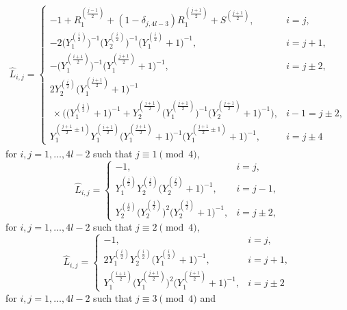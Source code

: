 \documentclass[pdftex]{sigma}
\numberwithin{equation}{section}
\begin{document}
	\begin{gather*}\hat{L}_{i,j}=\begin{cases}
		-1+R_1^{(\frac{j-1}{2})}+(1-\delta_{j,4l-3})R_1^{(\frac{j+1}{2})}+S^{(\frac{j+1}{2})},&i=j,\\
		-2\bigl(Y_1^{(\frac{i}{2})}\bigr)^{-1}\bigl(Y_2^{(\frac{i}{2})}\bigr)^{-1}\bigl(Y_1^{(\frac{i}{2})}+1\bigr)^{-1},&i=j+1,\\
		-\bigl(Y_1^{(\frac{i+1}{2})}\bigr)^{-1}\bigl(Y_1^{(\frac{j+1}{2})}+1\bigr)^{-1},&i=j\pm2,\\
2Y_2^{(\frac{i}{2})}\bigl(Y_1^{(\frac{j+1}{2})}+1\bigr)^{-1} \\
\ \times \bigl(\bigl(Y_1^{(\frac{i}{2})}+1\bigr)^{-1}+Y_2^{(\frac{j+1}{2})}\bigl(Y_1^{(\frac{j+1}{2})}\bigr)^{-1}\bigl(Y_2^{(\frac{j+1}{2})}+1\bigr)^{-1}\bigr),&i-1=j\pm2,\\
		Y_1^{(\frac{j+1}{2}\pm1)}Y_1^{(\frac{i+1}{2})}\bigl(Y_1^{(\frac{j+1}{2})}+1\bigr)^{-1}\bigl(Y_1^{(\frac{j+1}{2}\pm1)}+1\bigr)^{-1},& i=j\pm4
	\end{cases}\end{gather*}
for $i,j=1,\dots,4l-2$ such that $j\equiv1\pmod{4}$,
	\[\hat{L}_{i,j}=\begin{cases}
		-1,& i=j,\\
		Y_1^{(\frac{j}{2})}Y_2^{(\frac{j}{2})}\bigl(Y_2^{(\frac{j}{2})}+1\bigr)^{-1},& i=j-1,\\
		Y_2^{(\frac{i}{2})}\bigl(Y_2^{(\frac{j}{2})}\bigr)^2\bigl(Y_2^{(\frac{j}{2})}+1\bigr)^{-1},& i=j\pm2,
	\end{cases}\]
for $i,j=1,\dots,4l-2$ such that $j\equiv2\pmod{4}$,
	\[\hat{L}_{i,j}=\begin{cases}
		-1,& i=j,\\
		2Y_1^{(\frac{i}{2})}Y_2^{(\frac{i}{2})}\bigl(Y_1^{(\frac{i}{2})}+1\bigr)^{-1},& i=j+1,\\
		Y_1^{(\frac{i+1}{2})}\bigl(Y_1^{(\frac{j+1}{2})}\bigr)^2\bigl(Y_1^{(\frac{j+1}{2})}+1\bigr)^{-1},& i=j\pm2
	\end{cases}\]
for $i,j=1,\dots,4l-2$ such that $j\equiv3\pmod{4}$ and
\end{document}

